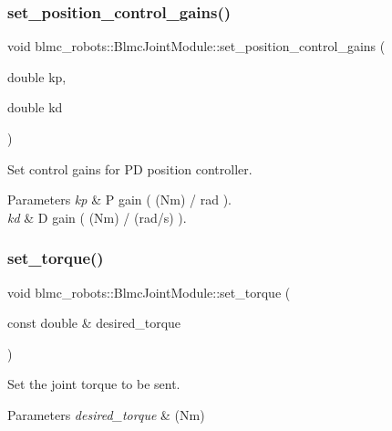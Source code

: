 \subsubsection{\texorpdfstring{set\+\_\+position\+\_\+control\+\_\+gains()}{set\_position\_control\_gains()}}
{\footnotesize\ttfamily void blmc\+\_\+robots\+::\+Blmc\+Joint\+Module\+::set\+\_\+position\+\_\+control\+\_\+gains (\begin{DoxyParamCaption}\item[{double}]{kp,  }\item[{double}]{kd }\end{DoxyParamCaption})}



Set control gains for PD position controller. 


\begin{DoxyParams}{Parameters}
{\em kp} & P gain ( (Nm) / rad ). \\
\hline
{\em kd} & D gain ( (Nm) / (rad/s) ). \\
\hline
\end{DoxyParams}
\mbox{\label{classblmc__robots_1_1BlmcJointModule_adeb28005a7160ead68603aed4262508f}} 
\subsubsection{\texorpdfstring{set\+\_\+torque()}{set\_torque()}}
{\footnotesize\ttfamily void blmc\+\_\+robots\+::\+Blmc\+Joint\+Module\+::set\+\_\+torque (\begin{DoxyParamCaption}\item[{const double \&}]{desired\+\_\+torque }\end{DoxyParamCaption})}



Set the joint torque to be sent. 


\begin{DoxyParams}{Parameters}
{\em desired\+\_\+torque} & (Nm) \\
\hline
\end{DoxyParams}
\mbox{\label{classblmc__robots_1_1BlmcJointModule_ae59680a947539306e391a12ad2d071bb}} 
